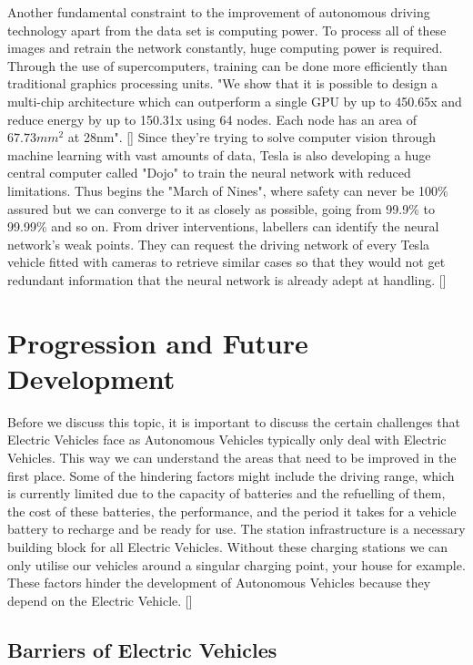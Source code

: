 \documentclass{article}
\begin{document}
Another fundamental constraint to the improvement of autonomous driving technology apart from the data set is computing power. To process all of these images and retrain the network constantly, huge computing power is required. Through the use of supercomputers, training can be done more efficiently than traditional graphics processing units. "We show that it is possible to design a multi-chip architecture which can outperform a single GPU by up to 450.65x and reduce energy by up to 150.31x using 64 nodes. Each node has an area of $67.73mm^2$ at 28nm". [\textcite{chen2014dadiannao}] Since they're trying to solve computer vision through machine learning with vast amounts of data, Tesla is also developing a huge central computer called "Dojo" to train the neural network with reduced limitations. Thus begins the "March of Nines", where safety can never be 100\% assured but we can converge to it as closely as possible, going from 99.9\% to 99.99\% and so on. From driver interventions, labellers can identify the neural network's weak points. They can request the driving network of every Tesla vehicle fitted with cameras to retrieve similar cases so that they would not get redundant information that the neural network is already adept at handling. [\textcite{autonomyday}]

\section{Progression and Future Development}

Before we discuss this topic, it is important to discuss the certain challenges that Electric Vehicles face as Autonomous Vehicles typically only deal with Electric Vehicles. This way we can understand the areas that need to be improved in the first place. Some of the hindering factors might include the driving range, which is currently limited due to the capacity of batteries and the refuelling of them, the cost of these batteries, the performance, and the period it takes for a vehicle battery to recharge and be ready for use. The station infrastructure is a necessary building block for all Electric Vehicles. Without these charging stations we can only utilise our vehicles around a singular charging point, your house for example. These factors hinder the development of Autonomous Vehicles because they depend on the Electric Vehicle. [\textcite{bimbraw2015autonomous}]

\subsection{Barriers of Electric Vehicles}
\end{document}
